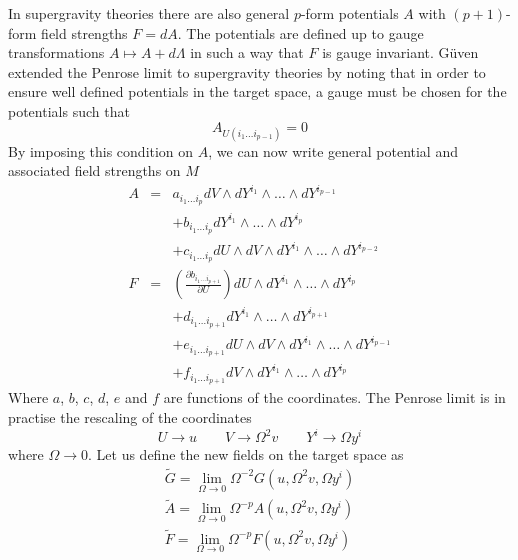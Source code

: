 \documentclass[11pt, a4paper, titlepage]{article}
\begin{document}
In supergravity theories there are also general $p$-form potentials $A$ with
$(p+1)$-form field strengths $F=dA$. The potentials are defined up to gauge
transformations $A\mapsto A+d\Lambda$ in such a way that $F$ is gauge invariant.
G\"{u}ven extended the Penrose limit to supergravity theories by noting that in
order to ensure well defined potentials in the target space, a gauge must be
chosen for the potentials such that
\begin{equation}
  \label{eq:bpg:guven}
  A_{U(i_1\ldots i_{p-1})}=0
\end{equation}
By imposing this condition on $A$, we can now write general potential and
associated field strengths on $M$
\begin{eqnarray}
  \label{eq:bpg:initial:A}
  A &=& a_{i_1 \ldots i_p} dV\wedge dY^{i_1}\wedge\ldots\wedge
  dY^{i_{p-1}} \\ \nonumber
  &&+b_{i_1\ldots i_p} dY^{i_1}\wedge\ldots\wedge dY^{i_p}\\ \nonumber
  &&+c_{i_1\ldots i_p} dU\wedge dV\wedge dY^{i_1}\wedge\ldots\wedge
  dY^{i_{p-2}} \\
  \label{eq:bpg:initial:F}
  F &=& \left( \frac{\partial b_{i_1 \ldots i_{p+1}}}{\partial U}
  \right) dU\wedge dY^{i_1}\wedge\ldots\wedge dY^{i_{p}} \\ \nonumber
  &&+ d_{i_1 \ldots i_{p+1}} dY^{i_1}\wedge\ldots\wedge dY^{i_{p+1}} \\ \nonumber
  &&+ e_{i_1 \ldots i_{p+1}} dU\wedge dV\wedge dY^{i_1}\wedge\ldots\wedge
  dY^{i_{p-1}} \\ \nonumber
  &&+ f_{i_1 \ldots i_{p+1}} dV\wedge dY^{i_1}\wedge\ldots\wedge dY^{i_{p}}  
\end{eqnarray}
Where $a$, $b$, $c$, $d$, $e$ and $f$ are functions of the coordinates. The
Penrose limit is in practise the rescaling of the coordinates
\begin{equation}
  \label{eq:bpg:rescale}
  U\rightarrow u\qquad V\rightarrow\Omega^2v\qquad Y^i\rightarrow\Omega y^i
\end{equation}
where $\Omega\rightarrow 0$. Let us define the new fields on the target space as
\begin{eqnarray}
  \label{eq:bpg:tildefields}
  \widetilde{G}=\lim_{\Omega\rightarrow 0} \Omega^{-2}G(u,\Omega^2v,\Omega y^i) \\ \nonumber
  \widetilde{A}=\lim_{\Omega\rightarrow 0} \Omega^{-p}A(u,\Omega^2v,\Omega y^i) \\ \nonumber
  \widetilde{F}=\lim_{\Omega\rightarrow 0} \Omega^{-p}F(u,\Omega^2v,\Omega y^i)
\end{eqnarray}
\end{document}
